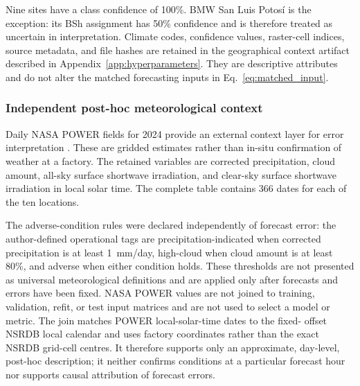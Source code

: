 Nine sites have a class confidence of 100\%. BMW San Luis Potos\'i is the
exception: its BSh assignment has 50\% confidence and is therefore treated as
uncertain in interpretation. Climate codes, confidence values, raster-cell
indices, source metadata, and file hashes are retained in the geographical
context artifact described in Appendix~\ref{app:hyperparameters}. They are
descriptive attributes and do not alter the matched forecasting inputs in
Eq.~\eqref{eq:matched_input}.

\subsubsection{Independent post-hoc meteorological context}

Daily NASA POWER fields for 2024 provide an external context layer for error
interpretation \cite{nasapowerdaily}. These are gridded estimates rather than
in-situ confirmation of weather at a factory. The retained variables are
corrected precipitation, cloud amount, all-sky surface shortwave irradiation,
and clear-sky surface shortwave irradiation in local solar time. The complete
table contains 366 dates for each of the ten locations.

The adverse-condition rules were declared independently of forecast error:
the author-defined operational tags are precipitation-indicated when corrected
precipitation is at least 1~mm/day, high-cloud when cloud amount is at least
80\%, and adverse when either condition holds. These thresholds are not
presented as universal meteorological definitions and are applied only after
forecasts and errors have been fixed. NASA POWER values are not joined to
training, validation, refit, or test input matrices and are not used to select a
model or metric. The join matches POWER local-solar-time dates to the fixed-
offset NSRDB local calendar and uses factory coordinates rather than the exact
NSRDB grid-cell centres. It therefore supports only an approximate, day-level,
post-hoc description; it neither confirms conditions at a particular forecast
hour nor supports causal attribution of forecast errors.
